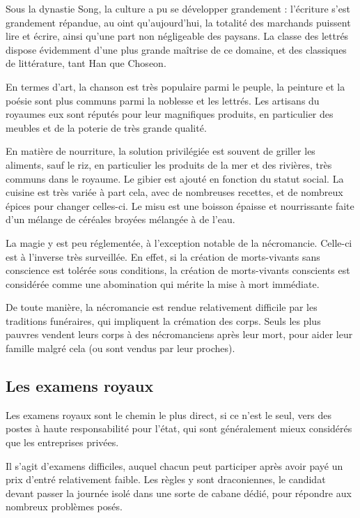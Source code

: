 \documentclass[10pt,a4paper]{book}
\newcommand{\nomroyaume}{Choseon}
\begin{document}
Sous la dynastie Song, la culture a pu se développer grandement : l'écriture s'est grandement répandue, au oint qu'aujourd'hui, la totalité des marchands puissent lire et écrire, ainsi qu'une part non négligeable des paysans. La classe des lettrés dispose évidemment d'une plus grande maîtrise de ce domaine, et des classiques de littérature, tant Han que \nomroyaume.

En termes d'art, la chanson est très populaire parmi le peuple, la peinture et la poésie sont plus communs parmi la noblesse et les lettrés. Les artisans du royaumes eux sont réputés pour leur magnifiques produits, en particulier des meubles et de la poterie de très grande qualité.

En matière de nourriture, la solution privilégiée est souvent de griller les aliments, sauf le riz, en particulier les produits de la mer et des rivières, très communs dans le royaume. Le gibier est ajouté en fonction du statut social. La cuisine est très variée à part cela, avec de nombreuses recettes, et de nombreux épices pour changer celles-ci. Le misu est une boisson épaisse et nourrissante faite d'un mélange de céréales broyées mélangée à de l'eau.

La magie y est peu réglementée, à l'exception notable de la nécromancie. Celle-ci est à l'inverse très surveillée. En effet, si la création de morts-vivants sans conscience est tolérée sous conditions, la création de morts-vivants conscients est considérée comme une abomination qui mérite la mise à mort immédiate.

De toute manière, la nécromancie est rendue relativement difficile par les traditions funéraires, qui impliquent la crémation des corps. Seuls les plus pauvres vendent leurs corps à des nécromanciens après leur mort, pour aider leur famille malgré cela (ou sont vendus par leur proches).
\subsection{Les examens royaux}
Les examens royaux sont le chemin le plus direct, si ce n'est le seul, vers des postes à haute responsabilité pour l'état, qui sont généralement mieux considérés que les entreprises privées.

Il s'agit d'examens difficiles, auquel chacun peut participer après avoir payé un prix d'entré relativement faible. Les règles y sont draconiennes, le candidat devant passer la journée isolé dans une sorte de cabane dédié, pour répondre aux nombreux problèmes posés.
\end{document}
